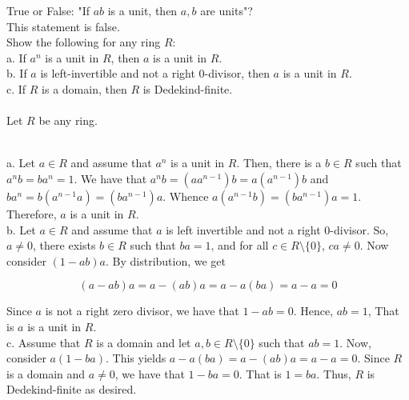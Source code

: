 True or False: "If $ab$ is a unit, then $a, b$ are units"? \\
This statement is false.\\
Show the following for any ring $R$:\\
a. If $a^n$ is a unit in $R$, then $a$ is a unit in $R$.\\
b. If $a$ is left-invertible and not a right $0$-divisor, then $a$ is a unit in $R$.\\
c. If $R$ is a domain, then $R$ is Dedekind-finite.\\\\
Let $R$ be any ring.\\

\begin{solution}\renewcommand{\qedsymbol}{}\ \\
    a. Let $a\in R$ and assume that $a^n$ is a unit in $R$. Then, there is a $b\in R$ such that
    $a^nb=ba^n=1$. We have that $a^nb=(aa^{n-1})b=a(a^{n-1})b$ and $ba^n=b(a^{n-1}a)=(ba^{n-1})a$.
    Whence $a(a^{n-1}b)=(ba^{n-1})a=1$. Therefore, $a$ is a unit in $R$.\\

    b. Let $a\in R$ and assume that $a$ is left invertible and not a right $0$-divisor. So, $a\neq0$,
    there exists $b\in R$ such that $ba=1$, and for all $c\in R\setminus\{0\}$, $ca\neq0$. Now consider
    $(1-ab)a$. By distribution, we get

    $$(a-ab)a=a-(ab)a=a-a(ba)=a-a=0$$

    Since $a$ is not a right zero divisor, we have that $1-ab=0$. Hence, $ab=1$, That is $a$ is a unit
    in $R$.\\

    c. Assume that $R$ is a domain and let $a,b\in R\setminus\{0\}$ such that $ab=1$. Now, consider
    $a(1-ba)$. This yields $a-a(ba)=a-(ab)a=a-a=0$. Since $R$ is a domain and $a\neq0$, we have that
    $1-ba=0$. That is $1=ba$. Thus, $R$ is Dedekind-finite as desired.

\end{solution}
